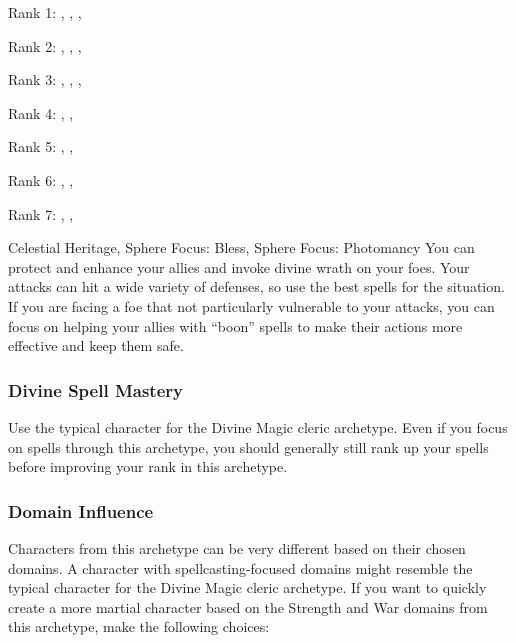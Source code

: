            \begin{raggeditemize}
                \item Rank 1: , , , 
                \item Rank 2: , , , 
                \item Rank 3: , , , 
                \item Rank 4: , , 
                \item Rank 5: , ,  
                \item Rank 6: , , 
                \item Rank 7: , , 
            \end{raggeditemize}
             Celestial Heritage, Sphere Focus: Bless, Sphere Focus: Photomancy
             You can protect and enhance your allies and invoke divine wrath on your foes.
            Your attacks can hit a wide variety of defenses, so use the best spells for the situation.
            If you are facing a foe that not particularly vulnerable to your attacks, you can focus on helping your allies with ``boon'' spells to make their actions more effective and keep them safe.

        \subsubsection{Divine Spell Mastery}
            Use the typical character for the Divine Magic cleric archetype.
            Even if you focus on spells through this archetype, you should generally still rank up your spells before improving your rank in this archetype.

        \subsubsection{Domain Influence}
            Characters from this archetype can be very different based on their chosen domains.
            A character with spellcasting-focused domains might resemble the typical character for the Divine Magic cleric archetype.
            If you want to quickly create a more martial character based on the Strength and War domains from this archetype, make the following choices:


